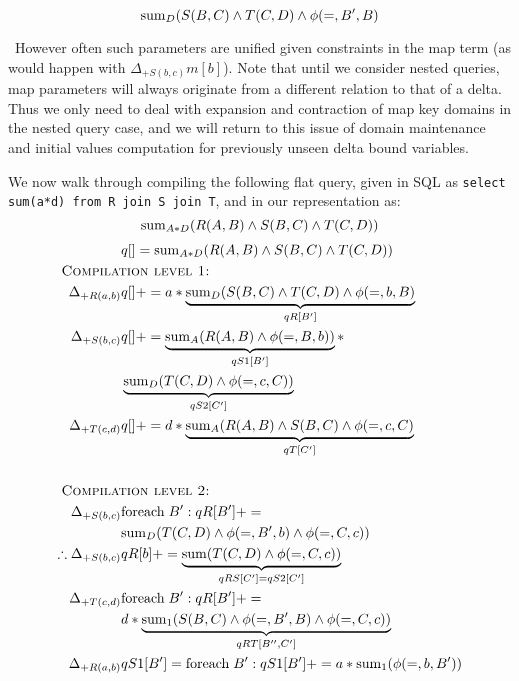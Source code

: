 \[\mathrm{sum}_{D}(S(B,C) \wedge T(C,D) \wedge \phi(=,B',B)\]

\noindent~However often such parameters are unified given constraints in the map
term (as would happen with $\Delta_{+S(b,c)} m[b]$). Note that until we consider
nested queries, map parameters will always originate from a different
relation to that of a delta. Thus we only need to deal with expansion and
contraction of map key domains in the nested query case, and we will return to
this issue of domain maintenance and initial values computation for previously
unseen delta bound variables.

\begin{example}
We now walk through compiling the following flat query, given in SQL as
\texttt{select sum(a*d) from R join S join T}, and in our representation as:
\[\mathrm{sum}_{A*D}(R(A,B) \wedge S(B,C) \wedge T(C,D))\]
\begin{align*}
& q[] = \algsum_{A*D}(R(A,B) \wedge S(B,C) \wedge T(C,D))\\
& \hspace{-1.5cm}\mbox{\sc Compilation level 1:}\\
\Delta_{+R(a,b)} & q[] +=
a * \underbrace{\algsum_{D}(S(B,C) \wedge T(C,D) \wedge \phi(=,b,B)}_{qR[B']}\\
\Delta_{+S(b,c)} & q[] +=
\underbrace{\algsum_{A}(R(A,B) \wedge \phi(=,B,b))}_{qS1[B']} * \\
& \underbrace{\algsum_{D}(T(C,D) \wedge \phi(=,c,C))}_{qS2[C']}\\
\Delta_{+T(c,d)} & q[] +=
d * \underbrace{\algsum_{A}(R(A,B) \wedge S(B,C) \wedge \phi(=,c,C)}_{qT[C']}\\
\\
& \hspace{-1.5cm}\mbox{\sc Compilation level 2:}\\
\Delta_{+S(b,c)} & \algforeach \; B': qR[B'] += \\
& \algsum_{D}(T(C,D) \wedge \phi(=,B',b) \wedge \phi(=,C,c))
 \\
\therefore \Delta_{+S(b,c)} & qR[b] +=
\underbrace{\algsum(T(C,D) \wedge \phi(=,C,c))}_{qRS[C'] = qS2[C']}
\\
\Delta_{+T(c,d)} & \algforeach \; B': qR[B'] +=  \\
& d * \underbrace{\algsum_{1}(S(B,C) \wedge \phi(=,B',B) \wedge
  \phi(=,C,c))}_{qRT[B'',C']}
\\
\Delta_{+R(a,b)} & qS1[B'] = \algforeach \; B': qS1[B'] +=
a * \algsum_{1}(\phi(=,b,B'))
\\

\end{align*}
\end{example}
